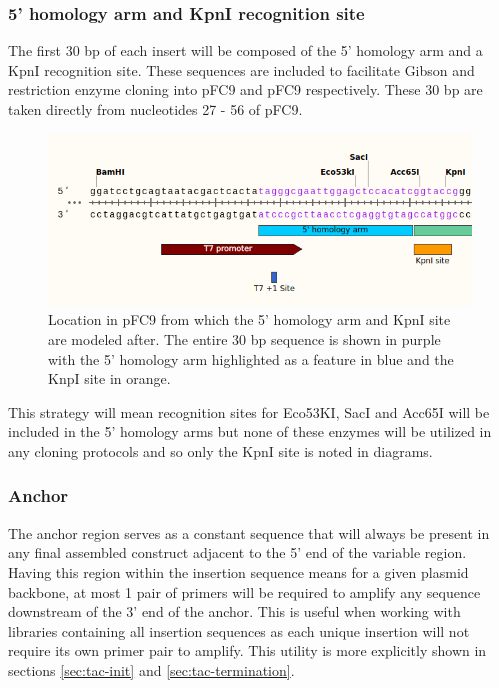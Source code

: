 \documentclass[11pt]{article}
\begin{document}
\subsubsection{5' homology arm and KpnI recognition site}

The first 30 bp of each insert will be composed of the 5' homology arm and a KpnI recognition site. These sequences are included to facilitate Gibson and restriction enzyme cloning into pFC9 and pFC9 respectively. These 30 bp are taken directly from nucleotides 27 - 56 of pFC9.

\begin{figure}[h]
	\includegraphics[width=12cm]{images/variable_region/5_homology_arm.png}
	\centering
	\caption{Location in pFC9 from which the 5' homology arm and KpnI site are modeled after. The entire 30 bp sequence is shown in purple with the 5' homology arm highlighted as a feature in blue and the KnpI site in orange.}
	\label{fig:1}
\end{figure}

This strategy will mean recognition sites for Eco53KI, SacI and Acc65I will be included in the 5' homology arms but none of these enzymes will be utilized in any cloning protocols and so only the KpnI site is noted in diagrams.


\subsubsection{Anchor}

The anchor region serves as a constant sequence that will always be present in any final assembled construct adjacent to the 5' end of the variable region. Having this region within the insertion sequence means for a given plasmid backbone, at most 1 pair of primers will be required to amplify any sequence downstream of the 3' end of the anchor. This is useful when working with libraries containing all insertion sequences as each unique insertion will not require its own primer pair to amplify. This utility is more explicitly shown in sections \ref{sec:tac-init} and \ref{sec:tac-termination}. 
\end{document}
